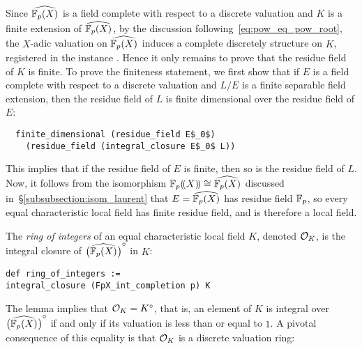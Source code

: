 \documentclass[sigplan,screen]{acmart}
\begin{document}
Since $\FpXCompl$ is a field complete with respect to a discrete valuation and $K$ is a finite extension of $\FpXCompl$, by the discussion following~\eqref{eq:pow_eq_pow_root}, the $X$-adic valuation on $\FpXCompl$ induces a complete\href{https://github.com/mariainesdff/local_fields_journal/blob/0b408ff3af36e18f991f9d4cb87be3603cfc3fc3/src/eq_characteristic/valuation.lean#L57}{\extlink} discretely\href{https://github.com/mariainesdff/local_fields_journal/blob/0b408ff3af36e18f991f9d4cb87be3603cfc3fc3/src/eq_characteristic/valuation.lean#L60}{\extlink}  structure on $K$, registered in the instance \href{https://github.com/mariainesdff/local_fields_journal/blob/0b408ff3af36e18f991f9d4cb87be3603cfc3fc3/src/eq_characteristic/valuation.lean#L54}{\extlink}. Hence it only remains to prove that the residue field of $K$ is finite. To prove the finiteness statement, we first show that if $E$ is a field complete with respect to a discrete valuation and $L/E$ is a finite separable field extension, then the residue field of $L$ is finite dimensional over the residue field of $E$\href{https://github.com/mariainesdff/local_fields_journal/blob/0b408ff3af36e18f991f9d4cb87be3603cfc3fc3/src/discrete_valuation_ring/residue_field.lean#L379}{\extlink}:
\begin{lstlisting}
  finite_dimensional (residue_field E$_0$) 
    (residue_field (integral_closure E$_0$ L))
\end{lstlisting}
This implies that if the residue field of $E$ is finite, then so is the residue field of $L$. Now, it follows from the isomorphism $\laurentseries\cong\FpXCompl$ discussed in~\S\ref{subsubsection:isom_laurent} that $E=\FpXCompl$ has residue field $\mathbb{F}_{p}$, so every equal characteristic local field has finite residue field, and is therefore a local field.

The \emph{ring of integers} of an equal characteristic local field $K$, denoted $\mathcal{O}_{K}$, is the integral closure of $\FpXComplInt$ in $K$\href{https://github.com/mariainesdff/local_fields_journal/blob/0b408ff3af36e18f991f9d4cb87be3603cfc3fc3/src/eq_characteristic/basic.lean#L375}{\extlink}:
\begin{lstlisting}
def ring_of_integers := 
integral_closure (FpX_int_completion p) K
\end{lstlisting}
The lemma  implies that $\mathcal{O}_{K} = {K}^\circ$, that is, an element of $K$ is integral over $\FpXComplInt$ if and only if its valuation is less than or equal to $1$. A pivotal consequence of this equality is that $\mathcal{O}_{K}$ is a discrete valuation ring\href{https://github.com/mariainesdff/local_fields_journal/blob/0b408ff3af36e18f991f9d4cb87be3603cfc3fc3/src/eq_characteristic/valuation.lean#L64}{\extlink}:
\end{document}
